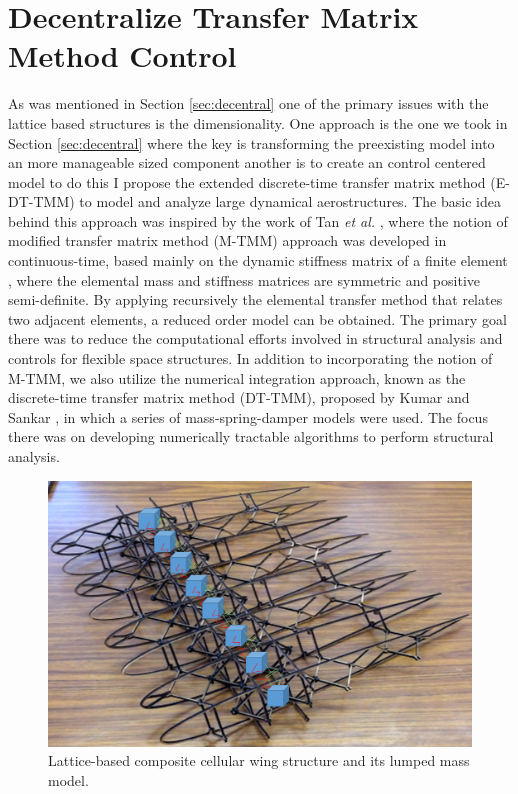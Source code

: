 \documentclass[11pt]{ucthesis}
\begin{document}
\section{Decentralize Transfer Matrix Method Control}
As was mentioned in Section \ref{sec:decentral} one of the primary issues with the lattice based structures is the dimensionality. One approach is the one we took in Section \ref{sec:decentral} where the key is transforming the preexisting model into an more manageable sized component another is to create an control centered model to do this I propose the extended discrete-time transfer matrix method (E-DT-TMM) to model and analyze large dynamical aerostructures. The basic idea behind this approach was inspired by the work of Tan {\it et al.} \cite{tan1990modified}, where the notion of modified transfer matrix method (M-TMM) approach was developed in continuous-time, based mainly on the dynamic stiffness matrix of a finite element \cite{degen1985combined}, where the elemental mass and stiffness matrices are symmetric and positive semi-definite. By applying recursively the elemental transfer method that relates two adjacent elements, a reduced order model can be obtained. The primary goal there was to reduce the computational efforts involved in structural analysis and controls for flexible space structures. In addition to incorporating the notion of M-TMM, we also utilize the numerical integration approach, known as the discrete-time transfer matrix method (DT-TMM), proposed by Kumar and Sankar \cite{kumar1986new}, in which a series of mass-spring-damper models were used. The focus there was on developing numerically tractable algorithms to perform structural analysis.

\begin{figure}[thpb]
\centering
\includegraphics[width=1\linewidth]{Figures/WingLump.png}
\caption{Lattice-based composite cellular wing structure and its lumped mass model.}
\label{fig:lumpwing}
\end{figure}
\end{document}
